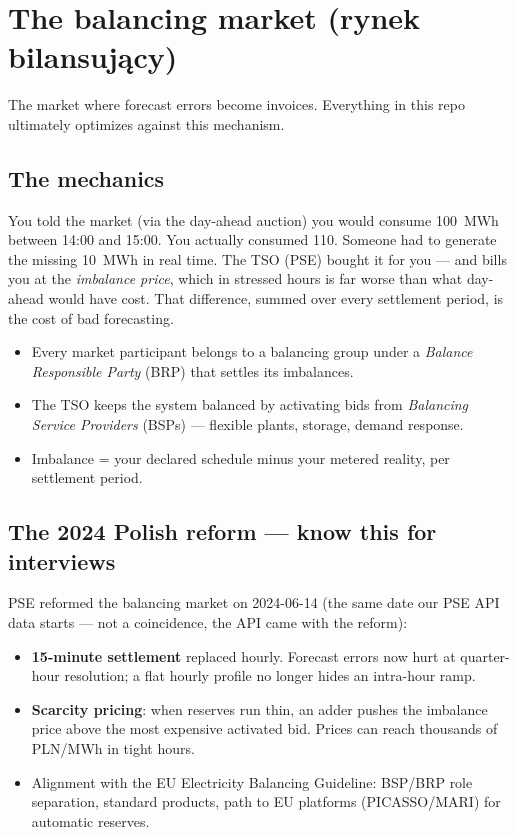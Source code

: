\section{The balancing market (rynek bilansuj\k{a}cy)}

The market where forecast errors become invoices. Everything in this
repo ultimately optimizes against this mechanism.

\subsection{The mechanics}

You told the market (via the day-ahead auction) you would consume 100~MWh
between 14:00 and 15:00. You actually consumed 110. Someone had to
generate the missing 10~MWh in real time. The TSO (PSE) bought it for you
--- and bills you at the \emph{imbalance price}, which in stressed hours is
far worse than what day-ahead would have cost. That difference, summed
over every settlement period, is the cost of bad forecasting.

\begin{itemize}
  \item Every market participant belongs to a balancing group under a
        \emph{Balance Responsible Party} (BRP) that settles its imbalances.
  \item The TSO keeps the system balanced by activating bids from
        \emph{Balancing Service Providers} (BSPs) --- flexible plants,
        storage, demand response.
  \item Imbalance = your declared schedule minus your metered reality,
        per settlement period.
\end{itemize}

\subsection{The 2024 Polish reform --- know this for interviews}

PSE reformed the balancing market on 2024-06-14 (the same date our PSE
API data starts --- not a coincidence, the API came with the reform):

\begin{itemize}
  \item \textbf{15-minute settlement} replaced hourly. Forecast errors
        now hurt at quarter-hour resolution; a flat hourly profile no
        longer hides an intra-hour ramp.
  \item \textbf{Scarcity pricing}: when reserves run thin, an adder
        pushes the imbalance price above the most expensive activated
        bid. Prices can reach thousands of PLN/MWh in tight hours.
  \item Alignment with the EU Electricity Balancing Guideline: BSP/BRP
        role separation, standard products, path to EU platforms
        (PICASSO/MARI) for automatic reserves.
\end{itemize}

